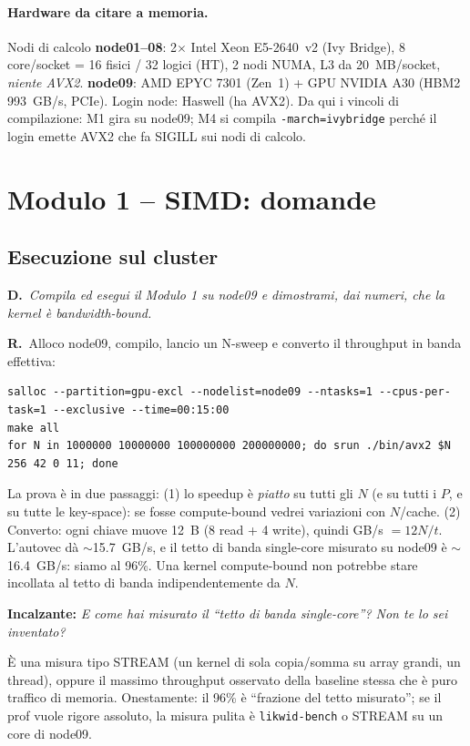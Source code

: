 \documentclass[11pt,a4paper]{article}
\newcommand{\D}[1]{\begin{dom}\small\textbf{D.}\ \itshape #1\end{dom}}
\newcommand{\R}{\noindent\textbf{R.}\ }
\newcommand{\Inc}[1]{\par\smallskip\noindent\textbf{\textcolor{red!55!black}{Incalzante:}} \textit{#1}\ \par}
\begin{document}
\paragraph{Hardware da citare a memoria.}
Nodi di calcolo \textbf{node01--08}: 2$\times$ Intel Xeon E5-2640~v2 (Ivy Bridge), 8 core/socket = 16 fisici / 32 logici (HT), 2 nodi NUMA, L3 da 20~MB/socket, \emph{niente AVX2}. \textbf{node09}: AMD EPYC 7301 (Zen~1) + GPU NVIDIA A30 (HBM2 993~GB/s, PCIe). Login node: Haswell (ha AVX2). Da qui i vincoli di compilazione: M1 gira su node09; M4 si compila \texttt{-march=ivybridge} perché il login emette AVX2 che fa SIGILL sui nodi di calcolo.
\section{Modulo 1 -- SIMD: domande}

\subsection{Esecuzione sul cluster}

\D{Compila ed esegui il Modulo 1 su node09 e dimostrami, dai numeri, che la kernel è bandwidth-bound.}
\R Alloco node09, compilo, lancio un N-sweep e converto il throughput in banda effettiva:
\begin{lstlisting}[style=bash]
salloc --partition=gpu-excl --nodelist=node09 --ntasks=1 --cpus-per-task=1 --exclusive --time=00:15:00
make all
for N in 1000000 10000000 100000000 200000000; do srun ./bin/avx2 $N 256 42 0 11; done
\end{lstlisting}
La prova è in due passaggi: (1) lo speedup è \emph{piatto} su tutti gli $N$ (e su tutti i $P$, e su tutte le key-space): se fosse compute-bound vedrei variazioni con $N$/cache. (2) Converto: ogni chiave muove 12~B (8 read + 4 write), quindi GB/s $=12N/t$. L'autovec dà $\sim$15.7~GB/s, e il tetto di banda single-core misurato su node09 è $\sim$16.4~GB/s: siamo al 96\%. Una kernel compute-bound non potrebbe stare incollata al tetto di banda indipendentemente da $N$.
\Inc{E come hai misurato il ``tetto di banda single-core''? Non te lo sei inventato?} È una misura tipo STREAM (un kernel di sola copia/somma su array grandi, un thread), oppure il massimo throughput osservato della baseline stessa che è puro traffico di memoria. Onestamente: il 96\% è ``frazione del tetto misurato''; se il prof vuole rigore assoluto, la misura pulita è \texttt{likwid-bench} o STREAM su un core di node09.
\end{document}
